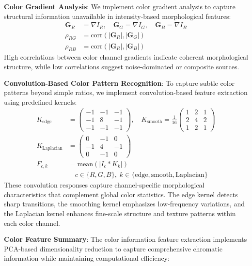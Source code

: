 \documentclass[twocolumn,10pt]{aastex631}
\begin{document}
\textbf{Color Gradient Analysis}: We implement color gradient analysis to capture structural information unavailable in intensity-based morphological features:
\begin{align}
\mathbf{G}_R &= \nabla I_R, \quad \mathbf{G}_G = \nabla I_G, \quad \mathbf{G}_B = \nabla I_B \\
\rho_{RG} &= \text{corr}(|\mathbf{G}_R|, |\mathbf{G}_G|) \\
\rho_{RB} &= \text{corr}(|\mathbf{G}_R|, |\mathbf{G}_B|)
\end{align}
High correlations between color channel gradients indicate coherent morphological structure, while low correlations suggest noise-dominated or composite sources.

\textbf{Convolution-Based Color Pattern Recognition}: To capture subtle color patterns beyond simple ratios, we implement convolution-based feature extraction using predefined kernels:
\begin{align}
K_{\text{edge}} &= \begin{pmatrix} -1 & -1 & -1 \\ -1 & 8 & -1 \\ -1 & -1 & -1 \end{pmatrix}, \quad 
K_{\text{smooth}} = \frac{1}{16}\begin{pmatrix} 1 & 2 & 1 \\ 2 & 4 & 2 \\ 1 & 2 & 1 \end{pmatrix} \\
K_{\text{Laplacian}} &= \begin{pmatrix} 0 & -1 & 0 \\ -1 & 4 & -1 \\ 0 & -1 & 0 \end{pmatrix} \\
F_{c,k} &= \text{mean}(|I_c * K_k|) \nonumber \\
&\quad c \in \{R,G,B\}, \; k \in \{\text{edge}, \text{smooth}, \text{Laplacian}\}
\end{align}
These convolution responses capture channel-specific morphological characteristics that complement global color statistics. The edge kernel detects sharp transitions, the smoothing kernel emphasizes low-frequency variations, and the Laplacian kernel enhances fine-scale structure and texture patterns within each color channel.

\textbf{Color Feature Summary}: The color information feature extraction implements PCA-based dimensionality reduction to capture comprehensive chromatic information while maintaining computational efficiency:
\end{document}

